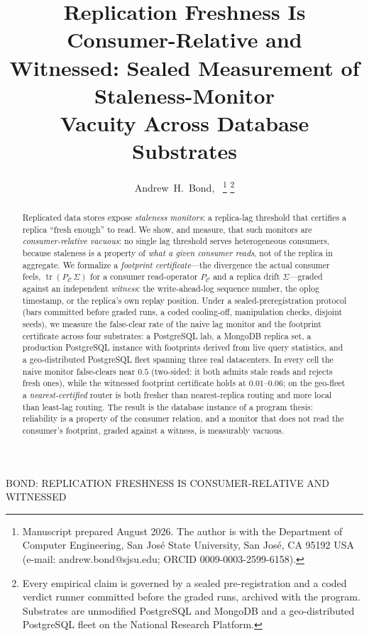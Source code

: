 \documentclass[lettersize,onecolumn]{IEEEtran}
\theoremstyle{remark}
\newcommand{\tr}{\operatorname{tr}}
\newcommand{\PC}{P_{\mathcal{C}}}
\begin{document}
\title{Replication Freshness Is Consumer-Relative and\\ Witnessed: Sealed Measurement of Staleness-Monitor\\ Vacuity Across Database Substrates}

\author{Andrew~H.~Bond,~%
\thanks{Manuscript prepared August 2026. The author is with the Department of
Computer Engineering, San Jos\'e State University, San Jos\'e, CA 95192 USA
(e-mail: andrew.bond@sjsu.edu; ORCID 0009-0003-2599-6158).}%
\thanks{Every empirical claim is governed by a sealed pre-registration and a
coded verdict runner committed before the graded runs, archived with the
program. Substrates are unmodified PostgreSQL and MongoDB and a geo-distributed
PostgreSQL fleet on the National Research Platform.}}

%
{BOND: REPLICATION FRESHNESS IS CONSUMER-RELATIVE AND WITNESSED}
\maketitle

\begin{abstract}
Replicated data stores expose \emph{staleness monitors}: a replica-lag
threshold that certifies a replica ``fresh enough'' to read. We show, and
measure, that such monitors are \emph{consumer-relative vacuous}: no single lag
threshold serves heterogeneous consumers, because staleness is a property of
\emph{what a given consumer reads}, not of the replica in aggregate. We
formalize a \emph{footprint certificate}---the divergence the actual consumer
feels, $\tr(\PC\,\Sigma)$ for a consumer read-operator $\PC$ and a replica drift
$\Sigma$---graded against an independent \emph{witness}: the write-ahead-log
sequence number, the oplog timestamp, or the replica's own replay position. Under
a sealed-preregistration protocol (bars committed before graded runs, a coded
cooling-off, manipulation checks, disjoint seeds), we measure the false-clear
rate of the naive lag monitor and the footprint certificate across four
substrates: a PostgreSQL lab, a MongoDB replica set, a production PostgreSQL
instance with footprints derived from live query statistics, and a
geo-distributed PostgreSQL fleet spanning three real datacenters. In every cell
the naive monitor false-clears near $0.5$ (two-sided: it both admits stale reads
and rejects fresh ones), while the witnessed footprint certificate holds at
$0.01$--$0.06$; on the geo-fleet a \emph{nearest-certified} router is both
fresher than nearest-replica routing and more local than least-lag routing. The
result is the database instance of a program thesis: reliability is a property of
the consumer relation, and a monitor that does not read the consumer's footprint,
graded against a witness, is measurably vacuous.
\end{abstract}
\end{document}
